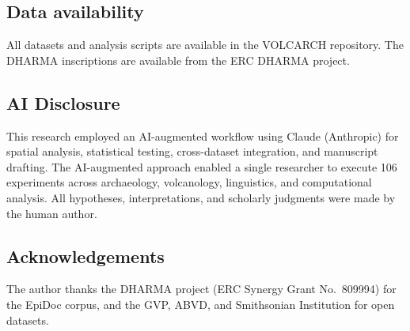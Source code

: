\documentclass[12pt]{article}
\begin{document}
\subsection*{Data availability}

All datasets and analysis scripts are available in the VOLCARCH repository.
The DHARMA inscriptions are available from the ERC DHARMA project.

\subsection*{AI Disclosure}

This research employed an AI-augmented workflow using Claude (Anthropic) for spatial analysis, statistical testing, cross-dataset integration, and manuscript drafting.
The AI-augmented approach enabled a single researcher to execute 106 experiments across archaeology, volcanology, linguistics, and computational analysis.
All hypotheses, interpretations, and scholarly judgments were made by the human author.

\subsection*{Acknowledgements}

The author thanks the DHARMA project (ERC Synergy Grant No.\ 809994) for the EpiDoc corpus, and the GVP, ABVD, and Smithsonian Institution for open datasets.

%
\end{document}
